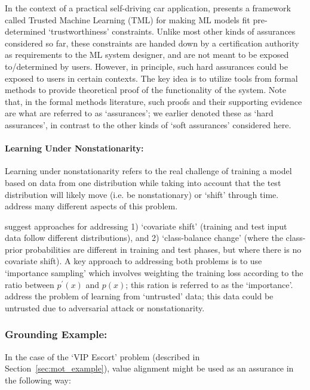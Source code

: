 In the context of a practical self-driving car application, \citet{Ghosh2016-dl} presents a framework called Trusted Machine Learning (TML) for making ML models fit pre-determined `trustworthiness' constraints. Unlike most other kinds of assurances considered so far, these constraints are handed down by a certification authority as requirements to the ML system designer, and are not meant to be exposed to/determined by users. However, in principle, such hard assurances could be exposed to users in certain contexts. The key idea is to utilize tools from formal methods to provide theoretical proof of the functionality of the system. Note that, in the formal methods literature, such proofs and their supporting evidence are what are referred to as `assurances'; we earlier denoted these as `hard assurances', in contrast to the other kinds of `soft assurances' considered here. 

\paragraph{Learning Under Nonstationarity:}
Learning under nonstationarity refers to the real challenge of training a model based on data from one distribution while taking into account that the test distribution will likely move (i.e. be nonstationary) or `shift' through time. \citet{Quinonero-Candela2009-fj} address many different aspects of this problem.

\citet{Sugiyama2013-ci} suggest approaches for addressing 1) `covariate shift' (training and test input data follow different distributions), and 2) `class-balance change' (where the class-prior probabilities are different in training and test phases, but where there is no covariate shift). A key approach to addressing both problems is to use `importance sampling' which involves weighting the training loss according to the ratio between $p^\prime(x)$ and $p(x)$; this ration is referred to as the `importance'. \citet{Charikar2017-kr} address the problem of learning from `untrusted' data; this data could be untrusted due to adversarial attack or nonstationarity.


\subsubsection{Grounding Example:}
In the case of the `VIP Escort' problem (described in Section~\ref{sec:mot_example}), value alignment might be used as an assurance in the following way:

